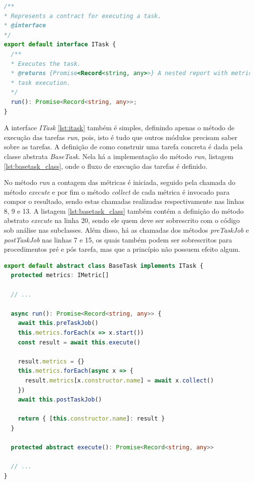 \documentclass[12pt]{tcc}
\begin{document}
\begin{lstlisting}[label={lst:itask}, caption={Interface do módulo de tarefas.}, language=TypeScript, breaklines=true]
/**
* Represents a contract for executing a task.
* @interface
*/
export default interface ITask {
  /**
  * Executes the task.
  * @returns {Promise<Record<string, any>>} A nested report with metrics and metadata about the
  * task execution.
  */
  run(): Promise<Record<string, any>>;
}   
\end{lstlisting}

	A interface \emph{ITask} \ref{lst:itask} também é simples, definindo apenas o método de execução das tarefas \emph{run}, pois, isto é tudo que outros módulos precisam saber sobre as tarefas.
	A definição de como construir uma tarefa concreta é dada pela classe abstrata \emph{BaseTask}.
	Nela há a implementação do método \emph{run}, listagem \ref{lst:basetask_class}, onde o fluxo de execução das tarefas é definido.

	No método \emph{run} a contagem das métricas é iniciada, seguido pela chamada do método \emph{execute} e por fim o método \emph{collect} de cada métrica é invocado para compor o resultado, sendo estas chamadas realizadas respectivamente nas linhas 8, 9 e 13.
	A listagem \ref{lst:basetask_class} também contém a definição do método abstrato \emph{execute} na linha 20, sendo ele quem deve ser sobrescrito com o código sob análise nas subclasses.
	Além disso, há as chamadas dos métodos \emph{preTaskJob} e \emph{postTaskJob} nas linhas 7 e 15, os quais também podem ser sobrescritos para procedimentos pré e pós tarefa, mas que a princípio não possuem efeito algum.

\begin{lstlisting}[label={lst:basetask_class}, caption={Fragmento de código da classe abstrata \emph{BaseTask}, implementação do método \emph{run} definido na interface \emph{ITask} \ref{lst:itask}.}, language=TypeScript, breaklines=true]
export default abstract class BaseTask implements ITask {
  protected metrics: IMetric[]

  // ...

  async run(): Promise<Record<string, any>> {
    await this.preTaskJob()
    this.metrics.forEach(x => x.start())
    const result = await this.execute()

    result.metrics = {}
    this.metrics.forEach(async x => {
      result.metrics[x.constructor.name] = await x.collect()
    })
    await this.postTaskJob()

    return { [this.constructor.name]: result }
  }

  protected abstract execute(): Promise<Record<string, any>>

  // ...
}
\end{lstlisting}
\end{document}
